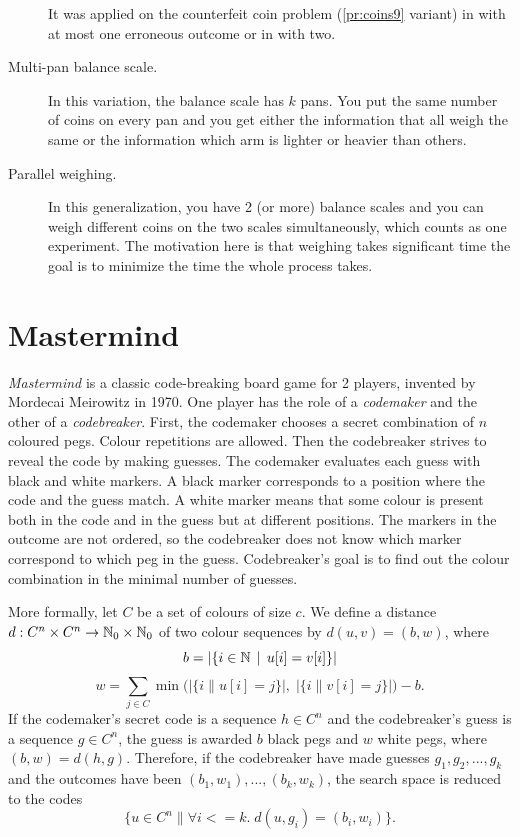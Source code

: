 \begin{description}
  It was applied on the counterfeit coin problem (\autoref{pr:coins9} variant)
  in \cite{coins-unreliable} with at most one erroneous outcome or in
  \cite{coins-unreliable2} with two.
\item[Multi-pan balance scale.]
  In this variation, the balance scale has $k$ pans.
  You put the same number of coins on every pan and
    you get either the information that all
    weigh the same or the information which arm is lighter or heavier
    than others\cite{coins-multiplearm}.
\item[Parallel weighing.]
  In this generalization, you have 2 (or more)
    balance scales and you can weigh different coins on
    the two scales simultaneously, which counts
    as one experiment\cite{coins-parallel}.
  The motivation here is that weighing takes significant time
    the goal is to minimize the time the whole process takes.
\end{description}

\section{Mastermind} \label{sec:mm}

\emph{Mastermind} is a classic code-breaking board game for 2 players,
  invented by Mordecai Meirowitz in 1970.
One player has the role of a \emph{codemaker} and the other of a \emph{codebreaker}.
First, the codemaker chooses a secret combination of $n$ coloured pegs.
Colour repetitions are allowed.
Then the codebreaker strives to reveal the code by making guesses.
The codemaker evaluates each guess with black and white markers.
A black marker corresponds to a position where the code and the guess match.
A white marker means that some colour is present both in the code
  and in the guess but at different positions.
The markers in the outcome are not ordered, so the codebreaker does not know
  which marker correspond to which peg in the guess.
Codebreaker's goal is to find out the colour combination in the minimal number of guesses.

More formally, let $C$ be a set of colours of size $c$.
We define a distance $d : C^n\times C^n -> \mathbb{N}_0\times\mathbb{N}_0$
  of two colour sequences by $d(u, v) = (b, w)$, where
\[
b = |\{ i \in\mathbb{N} \:\:|\:\: u[i] = v[i] \}|
\]
\[
w = \sum_{j\in C} \min\big(\big|\{ i \| u[i] = j \}\big|,\;
                           \big|\{ i \| v[i] = j\}\big|\big)  - b.
\]
If the codemaker's secret code is a sequence $h\in C^n$ and the codebreaker's guess is
  a sequence $g\in C^n$,
  the guess is awarded $b$ black pegs and $w$ white pegs, where
  $(b,w) = d(h,g)$.
Therefore, if the codebreaker have made guesses $g_1, g_2, ..., g_k$ and the outcomes
  have been $(b_1,w_1), ..., (b_k, w_k)$,
  the search space is reduced to the codes
  \[
  \{ u\in C^n \| \forall i<=k.\; d(u, g_i) = (b_i,w_i)\}.
  \]

